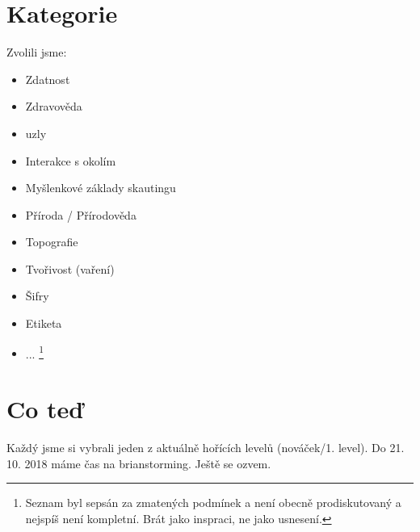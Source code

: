 \documentclass {article}
\begin{document}

\section{Kategorie} %
\label{sec:kategorie}
	Zvolili jsme:
	\begin{itemize}
		\item Zdatnost
		\item Zdravověda
		\item uzly
		\item Interakce s okolím
		\item Myšlenkové základy skautingu
		\item Příroda / Přírodověda
		\item Topografie
		\item Tvořivost (vaření)
		\item Šifry
		\item Etiketa
		\item ... \footnote{Seznam byl sepsán za zmatených podmínek a není obecně prodiskutovaný a nejspíš není kompletní. Brát jako inspraci, ne jako usnesení.} 
	\end{itemize}
\section{Co teď} %
\label{sec:co_ted}
	Každý jsme si vybrali jeden z aktuálně hořících levelů (nováček/1. level). Do 21. 10. 2018 máme čas na brianstorming. Ještě se ozvem.
\end{document}
